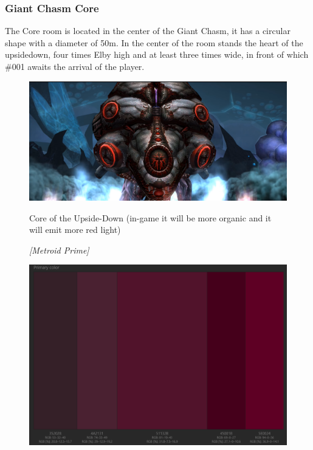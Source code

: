 \subsubsection{Giant Chasm Core}
The Core room is located in the center of the Giant Chasm, it has a circular shape with a diameter of 50m. In the center of the room stands the heart of the upsidedown, four times Elby high and at least three times wide, in front of which \#001 awaits the arrival of the player.

\vspace*{0.3cm}
\begin{figure}[H]
	\centering
	\includegraphics[width=0.8\linewidth]{images/visual_ref/15_giant_chasm/chasm_core.png}
	\caption*{Core of the Upside-Down (in-game it will be more organic and it will emit more red light)}
	\caption{ \textit{[Metroid Prime]}}
\end{figure}

\begin{figure}[H]
	\centering
	\includegraphics[width=0.8\linewidth]{images/visual_ref/15_giant_chasm/pallette/pallette_section_04.png}
\end{figure}

